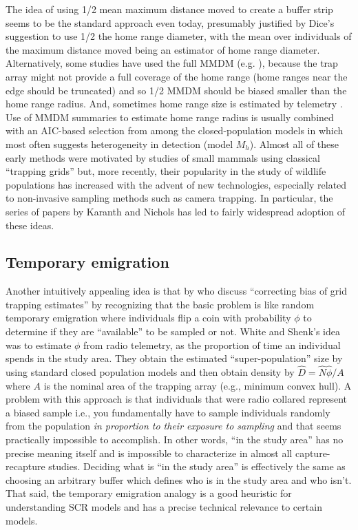 The idea of using 1/2 mean maximum distance moved
\citep[``MMDM''][]{wilson_anderson:1985a} to create a buffer strip
seems to be the standard approach even today, presumably justified by
Dice's suggestion to use 1/2 the home range diameter, with the mean
over individuals of the maximum distance moved being an estimator of
home range diameter. Alternatively, some studies have used the full
MMDM (e.g. \citet{parmenter_etal:2003}), because the trap array might
not provide a full coverage of the home range (home ranges near the
edge should be truncated) and so 1/2 MMDM should be biased smaller
than the home range radius.  And, sometimes home range size is
estimated by telemetry \citep{karanth:1995, bales_etal:2005}.
Use of MMDM summaries to estimate home range radius is usually
combined with an AIC-based selection from among the closed-population
models in \citet{otis_etal:1978} which most often suggests
heterogeneity in detection (model $M_h$).  Almost all of these early
methods were motivated by studies of small mammals using classical
``trapping grids'' but, more recently, their popularity in the study
of wildlife populations has increased with the advent of new
technologies, especially related to non-invasive sampling methods such
as camera trapping. In particular, the series of papers by Karanth and
Nichols \citep{karanth:1995, karanth_nichols:1998,
  karanth_nichols:2002} has led to fairly widespread adoption of these
ideas.



\subsection{Temporary emigration}

Another intuitively appealing idea is that by \citet{white_shenk:2000}
who discuss ``correcting bias of grid trapping estimates'' by
recognizing that the basic problem is like random temporary emigration
\citep{kendall_etal:1997,
  chandler_etal:2011,ivan_etal:2013a,ivan_etal:2013b} where
individuals flip a coin with probability $\phi$ to determine if they
are ``available'' to be sampled or not.  White and Shenk's idea was to
estimate $\phi$ from radio telemetry, as the proportion of time an
individual spends in the study area. They obtain the estimated
``super-population'' size by using standard closed population models
and then obtain density by $\hat{D} = \hat{N}\hat{\phi}/A$ where $A$
is the nominal area of the trapping array (e.g., minimum convex hull).
A problem with this approach is that individuals that were radio
collared represent a biased sample i.e., you fundamentally have to
sample individuals randomly from the population {\it in proportion to
  their exposure to sampling} and that seems practically impossible to
accomplish. In other words, ``in the study area'' has no precise
meaning itself and is impossible to characterize in almost all
capture-recapture studies.  Deciding what is ``in the study area'' is
effectively the same as choosing an arbitrary buffer which defines who
is in the study area and who isn't.  That said, the temporary
emigration analogy is a good heuristic for understanding SCR models
and has a precise technical relevance to certain models.


